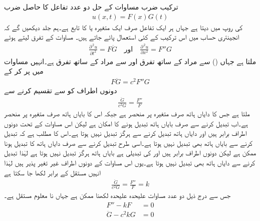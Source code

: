 \quad  ترکیب ضرب مساوات  کے حل دو عدد تفاعل کا حاصل ضرب
\begin{align}\label{مساوات_جزوی_مساوات_موج_ٹ}
u(x,t)=F(x)G(t)
\end{align}
کی روپ میں دیتا ہے جہاں ہر ایک تفاعل صرف ایک متغیرہ  یا  کا تابع ہے۔ہم جلد دیکھیں گے کہ انجینئری حساب میں اس ترکیب کے  کئی استعمال پائے جاتے ہیں۔ مساوات  کے تفرق لیتے ہوئے
\begin{align*}
\frac{\partial^{\,2}u}{\partial t^2}=F\ddot{G}\quad \text{اور}\quad \frac{\partial^{\,2}u}{\partial x^2}=F''G
\end{align*}
ملتا ہے جہاں () سے مراد  کے ساتھ تفرق اور  سے مراد  کے ساتھ تفرق ہے۔انہیں مساوات  میں پر کر کے
\begin{align*}
F\ddot{G}=c^2F''G
\end{align*}
دونوں اطراف کو  سے تقسیم کرنے سے
\begin{align*}
\frac{\ddot{G}}{c^2G}=\frac{F''}{F}
\end{align*}
ملتا ہے جس کا دایاں ہاتھ صرف متغیرہ  پر منحصر ہے جبکہ اس کا بایاں ہاتھ صرف متغیرہ  پر منحصر ہے۔اب  تبدیل کرنے سے صرف بایاں ہاتھ تبدیل ہونے کا امکان ہے لیکن اس مساوات کے تحت دونوں اطراف برابر ہیں اور دایاں ہاتھ  تبدیل کرنے سے ہرگز تبدیل نہیں ہوتا ہے۔اس کا مطلب ہے کہ  تبدیل کرنے سے بایاں ہاتھ بھی تبدیل نہیں ہوتا ہے۔اسی طرح  تبدیل کرنے سے صرف دایاں ہاتھ کا تبدیل ہونا ممکن ہے لیکن دونوں اطراف برابر ہیں اور  کی تبدیلی ہے بایاں ہاتھ ہرگز تبدیل نہیں ہوتا ہے لہٰذا  تبدیل کرنے سے دایاں ہاتھ بھی تبدیل نہیں ہوتا ہے۔یوں اس مساوات کے دونوں اطراف غیر تغیر پذیر ہیں لہٰذا انہیں مستقل  کے برابر لکھا جا سکتا ہے
\begin{align*}
\frac{\ddot{G}}{c^2G}=\frac{F''}{F}=k
\end{align*}
جس سے درج ذیل دو عدد مساوات علیحدہ علیحدہ لکھنا ممکن ہے جہاں  نا معلوم مستقل ہے۔ 
\begin{align}
F''-kF&=0\label{مساوات_جزوی_مساوات_موج_ث}\\
\ddot{G}-c^2kG&=0\label{مساوات_جزوی_مساوات_موج_ج}
\end{align}

